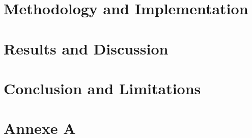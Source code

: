 \documentclass[12pt, a4paper]{report}
\begin{document}
\chapter{Methodology and Implementation}

\chapter{Results and Discussion}


\chapter{Conclusion and Limitations}


\setmainlanguage{english}
\printbibliography[title={References Bibliography}]

\appendix
\setmainlanguage{english}

\chapter{Annexe A}
\end{document}
